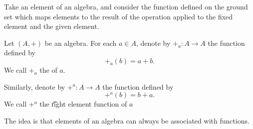 

Take an element of an algebra, and consider the function defined on the ground set which maps elements to the result of the operation applied to the fixed element and the given element.


Let $(A, +)$ be an algebra.
For each $a \in A$, denote by $+_a: A \to A$ the function defined by
\[
  +_a(b) = a + b.
\]
We call $+_a$ the  of $a$.

Similarly, denote by $+^a: A \to A$ the function defined by
\[
  +^{a}(b) = b + a.
\]
We call $+^a$ the \t{right element function} of $a$

The idea is that elements of an algebra can always be associated with functions.

\blankpage
